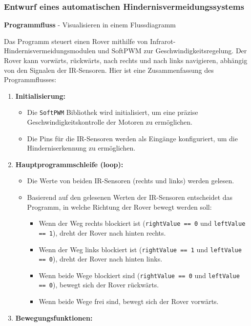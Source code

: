 \documentclass{vorlage-design-main}
\begin{document}
\hypertarget{entwurf-eines-automatischen-hindernisvermeidungssystems}{%
\subsubsection{Entwurf eines automatischen
Hindernisvermeidungssystems}\label{entwurf-eines-automatischen-hindernisvermeidungssystems}}

\textbf{Programmfluss} - Visualisieren in einem Flussdiagramm

Das Programm steuert einen Rover mithilfe von
Infrarot-Hindernisvermeidungsmodulen und SoftPWM zur
Geschwindigkeitsregelung. Der Rover kann vorwärts, rückwärts, nach
rechts und nach links navigieren, abhängig von den Signalen der
IR-Sensoren. Hier ist eine Zusammenfassung des Programmflusses:

\begin{enumerate}
\def\labelenumi{\arabic{enumi}.}

\item
  \textbf{Initialisierung:}

  \begin{itemize}
  
  \item
    Die \verb|SoftPWM| Bibliothek wird initialisiert,
    um eine präzise Geschwindigkeitskontrolle der Motoren zu
    ermöglichen.
  \item
    Die Pins für die IR-Sensoren werden als Eingänge konfiguriert, um
    die Hinderniserkennung zu ermöglichen.
  \end{itemize}
\item
  \textbf{Hauptprogrammschleife (loop):}

  \begin{itemize}
  
  \item
    Die Werte von beiden IR-Sensoren (rechts und links) werden gelesen.
  \item
    Basierend auf den gelesenen Werten der IR-Sensoren entscheidet das
    Programm, in welche Richtung der Rover bewegt werden soll:

    \begin{itemize}
    
    \item
      Wenn der Weg rechts blockiert ist
      (\verb|rightValue == 0| und
      \verb|leftValue == 1|), dreht der Rover nach
      hinten rechts.
    \item
      Wenn der Weg links blockiert ist
      (\verb|rightValue == 1| und
      \verb|leftValue == 0|), dreht der Rover nach
      hinten links.
    \item
      Wenn beide Wege blockiert sind
      (\verb|rightValue == 0| und
      \verb|leftValue == 0|), bewegt sich der Rover
      rückwärts.
    \item
      Wenn beide Wege frei sind, bewegt sich der Rover vorwärts.
    \end{itemize}
  \end{itemize}
\item
  \textbf{Bewegungsfunktionen:}


\end{enumerate}
\end{document}
